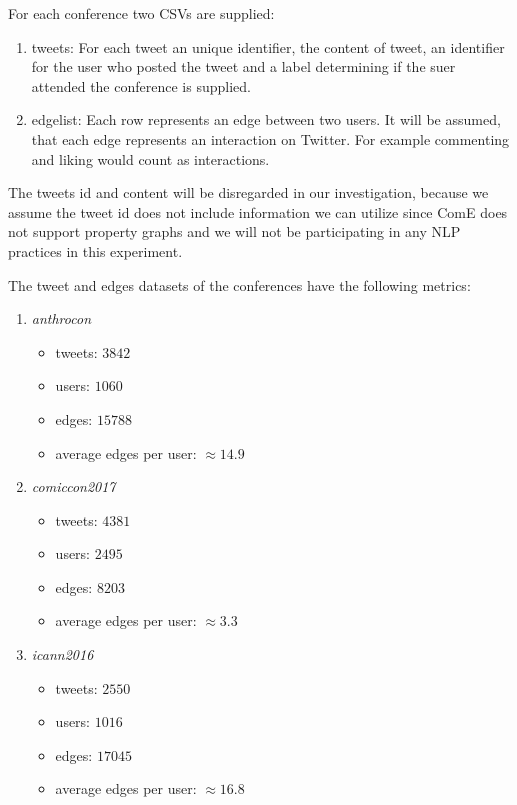\documentclass[sigconf]{acmart}
\begin{document}
For each conference two CSVs are supplied:

\begin{enumerate}
	\item tweets: For each tweet an unique identifier, the content of tweet, an identifier for the user who posted the tweet and a label determining if the suer attended the conference is supplied. 
	\item edgelist: Each row represents an edge between two users. It will be assumed, that each edge represents an interaction on Twitter. For example commenting and liking would count as interactions.
\end{enumerate}

The tweets id and content will be disregarded in our investigation, because we assume the tweet id does not include information we can utilize since ComE does not support property graphs and we will not be participating in any NLP practices in this experiment.

The tweet and edges datasets of the conferences have the following metrics:

\begin{enumerate}
	\item \textit{anthrocon}
	\begin{itemize}
		\item tweets: $3842$
		\item users: $1060$
		\item edges: $15788$
		\item average edges per user: $\approx14.9$
	\end{itemize}
	\item \textit{comiccon2017}
	\begin{itemize}
		\item tweets: $4381$
		\item users: $2495$
		\item edges: $8203$
		\item average edges per user: $\approx3.3$
	\end{itemize}
	\item \textit{icann2016}
	\begin{itemize}
		\item tweets: $2550$
		\item users: $1016$
		\item edges: $17045$
		\item average edges per user: $\approx16.8$
	\end{itemize}
\end{enumerate}
\end{document}
